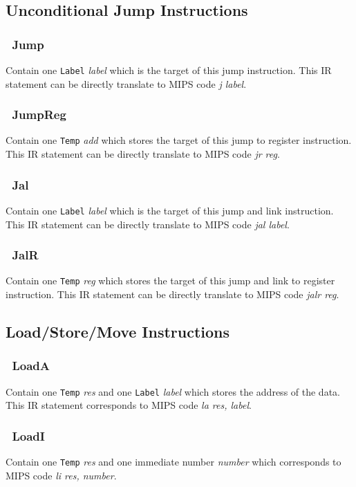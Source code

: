 \documentclass[journal]{IEEEtran}
\begin{document}
\subsection{Unconditional Jump Instructions}

\subsubsection{\ Jump}
Contain one \texttt{Label} \textit{label} which is the target of this jump instruction. This IR statement can be directly translate to MIPS code \textit{j label}.

\subsubsection{\ JumpReg}
Contain one \texttt{Temp} \textit{add} which stores the target of this jump to register instruction. This IR statement can be directly translate to MIPS code \textit{jr reg}.

\subsubsection{\ Jal}
Contain one \texttt{Label} \textit{label} which is the target of this jump and link instruction. This IR statement can be directly translate to MIPS code \textit{jal label}.

\subsubsection{\ JalR}
Contain one \texttt{Temp} \textit{reg} which stores the target of this jump and link to register instruction. This IR statement can be directly translate to MIPS code \textit{jalr reg}.

\subsection{Load/Store/Move Instructions}

\subsubsection{\ LoadA}
Contain one \texttt{Temp} \textit{res} and one \texttt{Label} \textit{label} which stores the address of the data. This IR statement corresponds to MIPS code \textit{la res, label}.

\subsubsection{\ LoadI}
Contain one \texttt{Temp} \textit{res} and one immediate number \textit{number} which corresponds to MIPS code \textit{li res, number}.
\end{document}
